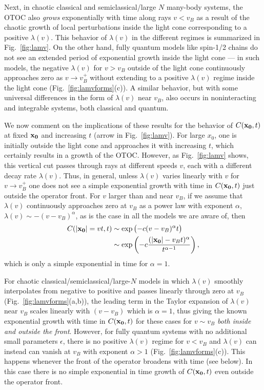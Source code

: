 \documentclass[aps,prl,reprint,superscriptaddress, longbibliography]{revtex4-1}
\newcommand{\vb}{v_B}
\begin{document}
Next, in chaotic classical and semiclassical/large $N$ many-body systems, the OTOC also \emph{grows} exponentially with time along rays  $v< \vb$ as a result of the chaotic growth of local perturbations inside the light cone corresponding to a positive $\lambda(v)$.  This behavior of $\lambda(v)$ in the different regimes is summarized in Fig.~\ref{fig:lamv}.   On the other hand, fully quantum models like spin-1/2 chains do not see an extended period of {exponential} growth inside the light cone --- in such models, the negative $\lambda(v)$ for $v>\vb$ outside of the light cone continuously approaches zero as $v \rightarrow v_B^{+}$ without extending to a positive $\lambda(v)$ regime inside the light cone (Fig.~\ref{fig:lamvforms}(c)).  A similar behavior,  but with some universal differences in the form of $\lambda(v)$ near $v_B$, also occurs in noninteracting and integrable systems, both classical and quantum.



We now comment on the implications of these results for the behavior of $C({\bf x_0},t)$ at fixed ${\bf x_0}$ and increasing $t$ (arrow in  Fig.~\ref{fig:lamv}). For large $x_0$, one is initially outside the light cone and approaches it with increasing $t$, which certainly results in a growth of the OTOC. However, as Fig.~\ref{fig:lamv} shows, this vertical cut passes through rays at different speeds $v$, each with a different decay rate $\lambda(v)$. Thus, in general, 
unless $\lambda(v)$ varies linearly with $v$ for $v \rightarrow v_B^+$ one does not see a simple exponential growth with time in $C({\bf x_0},t)$ just outside the operator front.  
For $v$ larger than and near $\vb$, if we assume that $\lambda(v)$ continuously approaches zero at $\vb$ as a power law with exponent $\alpha$, $\lambda(v) \sim -(v- \vb )^\alpha$, as is the case in all the models we are aware of, then
\begin{align}
C(|{\bf x_0}|=vt, t) &\sim \exp\big({- c (v- \vb )^\alpha}t \big)\nonumber \\
&\sim \exp\left({-c \frac{(|{\bf x_0}|-\vb t)^\alpha}{t^{\alpha-1}}}\right), 
\label{eq:tdep}
\end{align}
which is only a simple exponential in time for $\alpha =1$. 

For chaotic classical/semiclassical/large-$N$ models in which $\lambda(v)$ smoothly interpolates from negative to positive and passes linearly through zero at $\vb$ (Fig.~\ref{fig:lamvforms}(a,b)), the leading term in the Taylor expansion of $\lambda(v)$ near $\vb$ scales linearly with $(v-\vb)$  which is $\alpha=1$, thus giving the known exponential growth with time in $C({\bf x_0},t)$ for these cases for $v \sim \vb$ \emph{both inside and outside the front}. 
However, for fully quantum systems with no additional small parameters $\epsilon$, there is no positive $\lambda(v)$ regime for $v< \vb$ and $\lambda(v)$ can instead can vanish at $v_B$ with exponent $\alpha > 1$ (Fig.~\ref{fig:lamvforms}(c)). This happens whenever the front of the operator broadens with time (see below). In this case there is no simple exponential in time growth of $C({\bf x_0}, t)$ even outside the operator front.  
\end{document}
